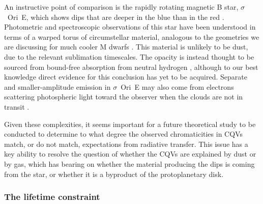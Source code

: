 \documentclass[11pt,twocolumn,tighten]{aastex63}
\begin{document}
An instructive point of comparison is the rapidly rotating magnetic B
star, $\sigma$~Ori~E, which shows dips that are deeper in the blue
than in the red \citep{1977ApJ...216L..31H}.  Photometric and
spectroscopic observations of this star have been understood in terms
of a warped torus of circumstellar material, analogous to the
geometries we are discussing for much cooler M dwarfs
\citep{1978ApJ...224L...5L,1985Ap&SS.116..285N,2005ApJ...630L..81T}.
This material is unlikely to be dust, due to the relevant sublimation
timescales.  The opacity is instead thought to be sourced from
bound-free absorption from neutral hydrogen
\citep{1985Ap&SS.116..285N}, although to our best knowledge direct
evidence for this conclusion has yet to be acquired.  Separate and
smaller-amplitude emission in $\sigma$~Ori~E may also come from
electrons scattering photospheric light toward the observer when the
clouds are not in transit \citep{2022MNRAS.511.4815B}.

Given these complexities, it seems important for a future theoretical
study to be conducted to determine to what degree the observed
chromaticities in CQVs match, or do not match, expectations from
radiative transfer.  This issue has a key ability to resolve the
question of whether the CQVs are explained by dust or by gas, which
has bearing on whether the material producing the dips is coming from
the star, or whether it is a byproduct of the protoplanetary disk.





\subsubsection{The lifetime constraint}
\end{document}
